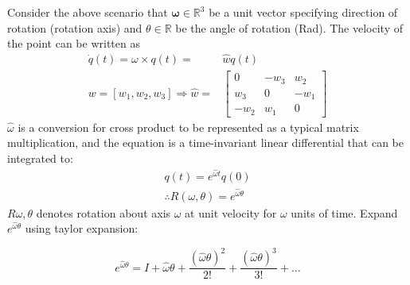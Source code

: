 \documentclass[letterpaper]{article}
\begin{document}
Consider the above scenario that $\mathbf{\omega} \in \mathbb{R}^{3}$ be a unit vector specifying direction of rotation
(rotation axis) and $\theta\in \mathbb{R}$ be the angle of rotation (Rad). The velocity of the point can be written as
\begin{equation*}
  \begin{split}
    \dot{q}(t) = \omega \times q(t) = & \widehat{w}q(t)\\
    w = [w_1, w_2, w_3] \Rightarrow \widehat{w} = & \begin{bmatrix}
      0 & -w_3 & w_2 \\ w_3 & 0 & -w_1 \\ -w_2 & w_1 & 0
    \end{bmatrix}
  \end{split}
\end{equation*}
$\widehat{\omega}$ is a conversion for cross product to be represented as a typical matrix multiplication, and the equation
is a time-invariant linear differential that can be integrated to:
\begin{equation}
  \begin{split}
    q(t) = e^{\widehat{\omega}t}q(0) \\
    \therefore R(\omega, \theta) = e^{\widehat{\omega}\theta}
  \end{split}
\end{equation}
$R{\omega, \theta}$ denotes rotation about axis $\omega$ at unit velocity for $\omega$ units of time. Expand $e^{\widehat{\omega}\theta}$
using taylor expansion: 

\begin{equation} \label{eqn:tyex}
  e^{\widehat{\omega}\theta} = I + \widehat{\omega}\theta + \frac{(\widehat{\omega}\theta)^2}{2!} + \frac{(\widehat{\omega}\theta)^3}{3!} + ... 
\end{equation}
\end{document}
